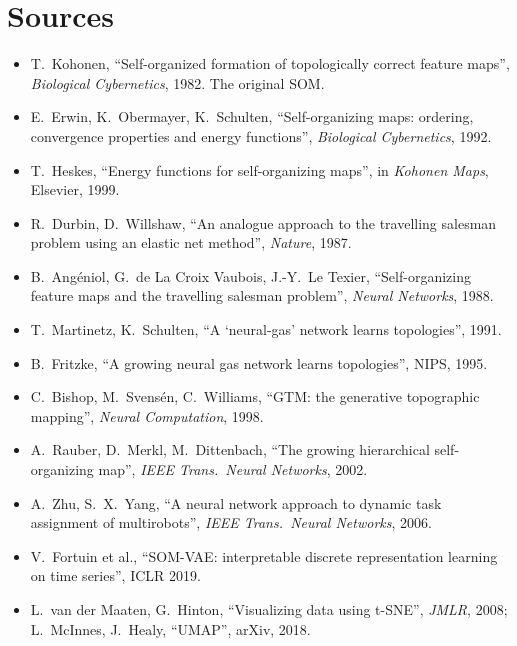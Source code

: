 \documentclass[11pt,a4paper]{article}
\begin{document}
\section*{Sources}
\small
\begin{itemize}[leftmargin=*]
\item T.~Kohonen, ``Self-organized formation of topologically correct feature maps'', \emph{Biological Cybernetics},
1982. The original SOM.
\item E.~Erwin, K.~Obermayer, K.~Schulten, ``Self-organizing maps: ordering, convergence properties and energy
functions'', \emph{Biological Cybernetics}, 1992.
\item T.~Heskes, ``Energy functions for self-organizing maps'', in \emph{Kohonen Maps}, Elsevier, 1999.
\item R.~Durbin, D.~Willshaw, ``An analogue approach to the travelling salesman problem using an elastic net
method'', \emph{Nature}, 1987.
\item B.~Angéniol, G.~de La Croix Vaubois, J.-Y.~Le Texier, ``Self-organizing feature maps and the travelling salesman
problem'', \emph{Neural Networks}, 1988.
\item T.~Martinetz, K.~Schulten, ``A `neural-gas' network learns topologies'', 1991.
\item B.~Fritzke, ``A growing neural gas network learns topologies'', NIPS, 1995.
\item C.~Bishop, M.~Svensén, C.~Williams, ``GTM: the generative topographic mapping'', \emph{Neural Computation},
1998.
\item A.~Rauber, D.~Merkl, M.~Dittenbach, ``The growing hierarchical self-organizing map'', \emph{IEEE Trans.\ Neural
Networks}, 2002.
\item A.~Zhu, S.~X.~Yang, ``A neural network approach to dynamic task assignment of multirobots'', \emph{IEEE Trans.\
Neural Networks}, 2006.
\item V.~Fortuin et al., ``SOM-VAE: interpretable discrete representation learning on time series'', ICLR 2019.
\item L.~van der Maaten, G.~Hinton, ``Visualizing data using t-SNE'', \emph{JMLR}, 2008; L.~McInnes, J.~Healy,
``UMAP'', arXiv, 2018.
\end{itemize}
\end{document}
